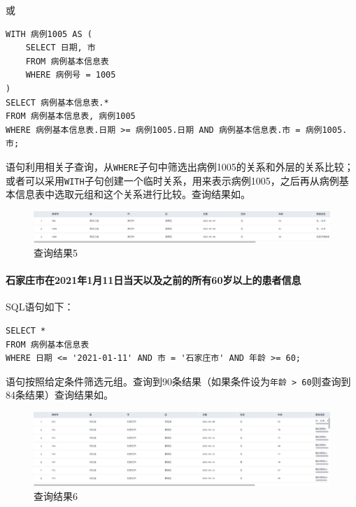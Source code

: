 \documentclass[lang=cn,11pt,a4paper,cite=authornum]{paper}
\begin{document}
或

\begin{code}
\begin{verbatim}
WITH 病例1005 AS (
    SELECT 日期, 市
    FROM 病例基本信息表
    WHERE 病例号 = 1005
)
SELECT 病例基本信息表.*
FROM 病例基本信息表, 病例1005
WHERE 病例基本信息表.日期 >= 病例1005.日期 AND 病例基本信息表.市 = 病例1005.市;
\end{verbatim}
\end{code}

语句利用相关子查询，从\texttt{WHERE}子句中筛选出病例1005的关系和外层的关系比较；或者可以采用\texttt{WITH}子句创建一个临时关系，用来表示病例1005，之后再从病例基本信息表中选取元组和这个关系进行比较。查询结果如。

\begin{figure}[!htb]
    \centering
    \includegraphics[width=\textwidth]{./images/lab1_query5.png}
    \caption{查询结果5\label{fig:query5}}
\end{figure}

\paragraph{石家庄市在2021年1月11日当天以及之前的所有60岁以上的患者信息} SQL语句如下：

\begin{code}
\begin{verbatim}
SELECT *
FROM 病例基本信息表
WHERE 日期 <= '2021-01-11' AND 市 = '石家庄市' AND 年龄 >= 60;
\end{verbatim}
\end{code}

语句按照给定条件筛选元组。查询到90条结果（如果条件设为\texttt{年龄 > 60}则查询到84条结果）查询结果如。

\begin{figure}[!htb]
    \centering
    \includegraphics[width=\textwidth]{./images/lab1_query6.png}
    \caption{查询结果6\label{fig:query6}}
\end{figure}
\end{document}
